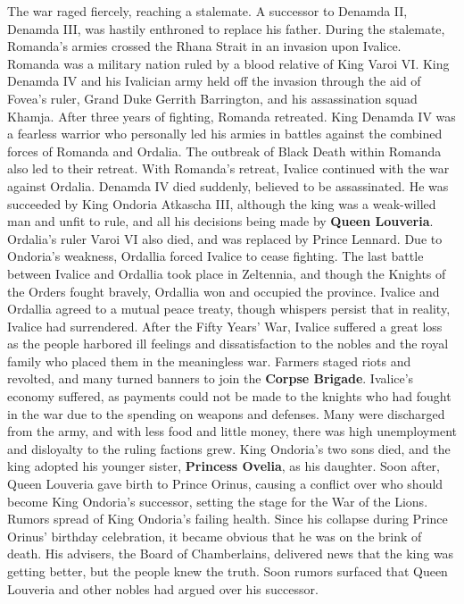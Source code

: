 %
The war raged fiercely, reaching a stalemate. 
A successor to Denamda II, Denamda III, was hastily enthroned to replace his father.
During the stalemate, Romanda's armies crossed the Rhana Strait in an invasion upon Ivalice. 
Romanda was a military nation ruled by a blood relative of King Varoi VI. 
King Denamda IV and his Ivalician army held off the invasion through the aid of Fovea’s ruler, Grand Duke Gerrith Barrington, and his assassination squad Khamja.
After three years of fighting, Romanda retreated. 
King Denamda IV was a fearless warrior who personally led his armies in battles against the combined forces of Romanda and Ordalia. 
The outbreak of Black Death within Romanda also led to their retreat.
With Romanda's retreat, Ivalice continued with the war against Ordalia.
Denamda IV died suddenly, believed to be assassinated. 
He was succeeded by King Ondoria Atkascha III, although the king was a weak-willed man and unfit to rule, and all his decisions being made by \textbf{Queen Louveria}.
Ordalia's ruler Varoi VI also died, and was replaced by Prince Lennard. 
Due to Ondoria's weakness, Ordallia forced Ivalice to cease fighting.
The last battle between Ivalice and Ordallia took place in Zeltennia, and though the Knights of the Orders fought bravely, Ordallia won and occupied the province. 
Ivalice and Ordallia agreed to a mutual peace treaty, though whispers persist that in reality, Ivalice had surrendered.
After the Fifty Years' War, Ivalice suffered a great loss as the people harbored ill feelings and dissatisfaction to the nobles and the royal family who placed them in the meaningless war. 
Farmers staged riots and revolted, and many turned banners to join the \textbf{Corpse Brigade}.
Ivalice's economy suffered, as payments could not be made to the knights who had fought in the war due to the spending on weapons and defenses. 
Many were discharged from the army, and with less food and little money, there was high unemployment and disloyalty to the ruling factions grew.
King Ondoria's two sons died, and the king adopted his younger sister, \textbf{Princess Ovelia}, as his daughter. 
Soon after, Queen Louveria gave birth to Prince Orinus, causing a conflict over who should become King Ondoria's successor, setting the stage for the War of the Lions.
Rumors spread of King Ondoria's failing health. 
Since his collapse during Prince Orinus' birthday celebration, it became obvious that he was on the brink of death. 
His advisers, the Board of Chamberlains, delivered news that the king was getting better, but the people knew the truth. Soon rumors surfaced that Queen Louveria and other nobles had argued over his successor.
